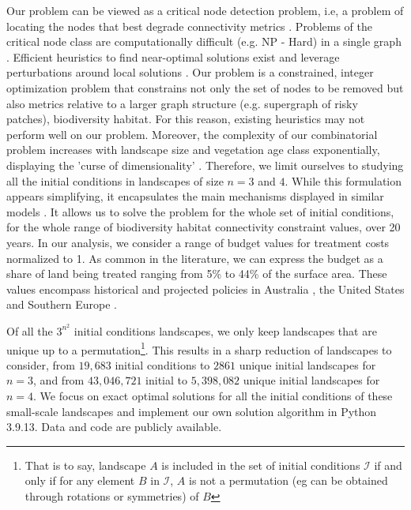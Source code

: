 Our problem can be viewed as a critical node detection problem, i.e, a problem of locating the nodes that best degrade connectivity metrics \citep{ARULSELVAN20092193}. Problems of the critical node class are computationally difficult (e.g. NP - Hard) in a single graph \citep{ARULSELVAN20092193, matsypura_wildfire_2018}. Efficient heuristics to find near-optimal solutions exist and leverage perturbations around local solutions \citep{ARULSELVAN20092193, Zhou2017}. Our problem is a constrained, integer optimization problem that constrains not only the set of nodes to be removed but also metrics relative to a larger graph structure (e.g. supergraph of risky patches), biodiversity habitat. For this reason, existing heuristics may not perform well on our problem. Moreover, the complexity of our combinatorial problem increases with landscape size and vegetation age class exponentially, displaying the 'curse of dimensionality' \citep{Bellman}. Therefore, we limit ourselves to studying all the initial conditions in landscapes of size $n=3$ and $4$. While this formulation appears simplifying, it encapsulates the main mechanisms displayed in similar models \citep{rachmawati_optimisation_2016, rachmawati_fuel_2018}. 
It allows us to solve the problem for the whole set of initial conditions, for the whole range of biodiversity habitat connectivity constraint values, over 20 years. 
In our analysis, we consider a range of budget values for treatment costs normalized to 1. As common in the literature, we can express the budget as a share of land being treated ranging from 5\% to 44\% of the surface area. These values encompass historical and projected policies in Australia \citep{burrows2013}, the United States \citep{GAO2019} and Southern Europe \citep{Fernandes2013}.

Of all the $3^{n^2}$ initial conditions landscapes, we only keep landscapes that are unique up to a permutation\footnote{That is to say, landscape $A$ is included in the set of initial conditions $\mathcal{I}$ if and only if for any element $B$ in $\mathcal{I}$, $A$ is not a permutation (eg can be obtained through rotations or symmetries) of $B$}. This results in a sharp reduction of landscapes to consider, from $19,683$ initial conditions to $2861$ unique initial landscapes for $n=3$, and from $43,046,721$ initial to $5,398,082$ unique initial landscapes for $n=4$. We focus on exact optimal solutions for all the initial conditions of these small-scale landscapes and implement our own solution algorithm in Python 3.9.13. Data and code are publicly available.



